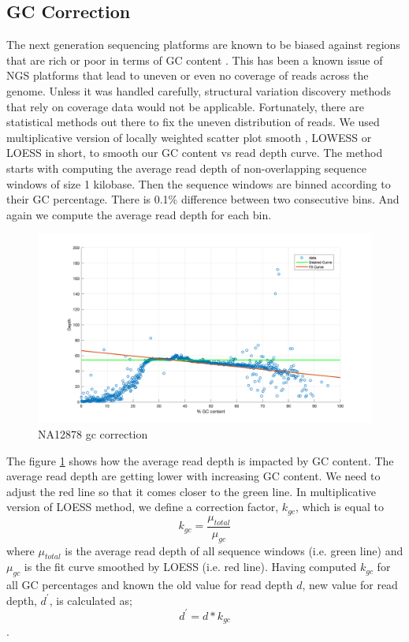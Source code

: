 \subsection{GC Correction}
The next generation sequencing platforms are known to be biased against regions that are rich or poor in terms of GC content \cite{smith2008rapid}. This has been a known issue of NGS platforms that lead to uneven or even no coverage of reads across the genome. Unless it was handled carefully, structural variation discovery methods that rely on coverage data would not be applicable. Fortunately, there are statistical methods out there to fix the uneven distribution of reads. We used multiplicative version of locally weighted scatter plot smooth \cite{cleveland1991computational}, LOWESS or LOESS in short, to smooth our GC content vs read depth curve. The method starts with computing the average read depth of non-overlapping sequence windows of size 1 kilobase. Then the sequence windows are binned according to their GC percentage. There is 0.1\% difference between two consecutive bins. And again we compute the average read depth for each bin.
\begin{figure}[ht]
    \centering
    \includegraphics[scale=0.25]{images/gcCorrection.png}
    \caption{NA12878 gc correction}
    \label{gcCorrection}
\end{figure}
The figure \ref{gcCorrection} shows how the average read depth is impacted by GC content. The average read depth are getting lower with increasing GC content. We need to adjust the red line so that it comes closer to the green line. In multiplicative version of LOESS method, we define a correction factor, $k_{gc}$, which is equal to $$k_{gc} = \frac{\mu_{total}}{\mu_{gc}}$$ where $\mu_{total}$ is the average read depth of all sequence windows (i.e. green line) and $\mu_{gc}$ is the fit curve smoothed by LOESS (i.e. red line). Having computed $k_{gc}$ for all GC percentages and known the old value for read depth $d$,  new value for read depth, $d^\prime$, is calculated as; $$d^\prime = d*k_{gc}$$.

